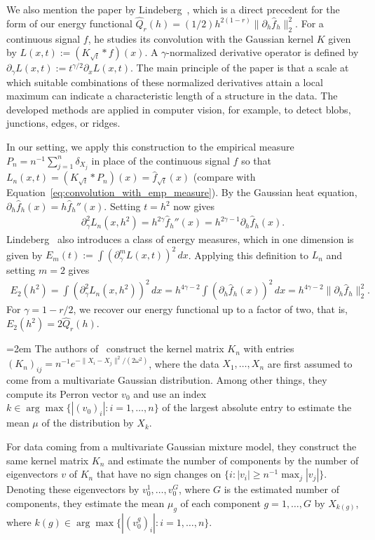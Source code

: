 We also mention the paper by Lindeberg~\cite{lindeberg_feature_nodate}, which is a direct precedent for the form of our energy functional $\hat{Q}_r(h)=(1/2)h^{2(1-r)}\|\partial_h\hat{f}_h\|_2^2$. For a continuous signal $f$, he studies its convolution with the Gaussian kernel $K$ given by $L(x,t):=(K_{\sqrt{t}}\ast f)(x)$. A $\gamma$-normalized derivative operator is defined by $\partial_{\gamma}L(x,t):=t^{\gamma/2}\partial_xL(x,t)$. The main principle of the paper is that a scale at which suitable combinations of these normalized derivatives attain a local maximum can indicate a characteristic length of a structure in the data. The developed methods are applied in computer vision, for example, to detect blobs, junctions, edges, or ridges.

In our setting, we apply this construction to the empirical measure $P_n=n^{-1}\sum_{j=1}^{n}\delta_{X_j}$ in place of the continuous signal $f$ so that $L_n(x,t)=(K_{\sqrt{t}}\ast P_n)(x)=\hat{f}_{\sqrt{t}}(x)$ (compare with Equation~\eqref{eq:convolution_with_emp_measure}). By the Gaussian heat equation, $\partial_h\hat{f}_h(x)=h\hat{f}_h''(x)$. Setting $t=h^2$ now gives
\begin{align*}
    \partial_{\gamma}^2L_n(x,h^2)=h^{2\gamma}\hat{f}_h''(x)=h^{2\gamma-1}\partial_h\hat{f}_h(x).
\end{align*}
Lindeberg~\cite[Equation~(79)]{lindeberg_feature_nodate} also introduces a class of energy measures, which in one dimension is given by $E_m(t):=\int(\partial_\gamma^mL(x,t))^2\,dx$. Applying this definition to $L_n$ and setting $m=2$ gives
\begin{align*}
    E_2(h^2)=\int(\partial_{\gamma}^2L_n(x,h^2))^2\,dx=h^{4\gamma-2}\int(\partial_h\hat{f}_h(x))^2\,dx=h^{4\gamma-2}\|\partial_h\hat{f}_h\|_2^2.
\end{align*}
For $\gamma=1-r/2$, we recover our energy functional up to a factor of two, that is, $E_2(h^2)=2\hat{Q}_r(h)$.


{\emergencystretch=2em\relax
The authors of~\cite{shi_data_2008} construct the kernel matrix $K_n$ with entries $(K_n)_{ij}=n^{-1}e^{-\|X_i-X_j\|^2/(2\omega^2)}$, where the data $X_1,\dots,X_n$ are first assumed to come from a multivariate Gaussian distribution. Among other things, they compute its Perron vector $v_0$ and use an index $k\in\arg\max\{|(v_0)_i|:i=1,\dots,n\}$ of the largest absolute entry to estimate the mean $\mu$ of the distribution by $X_k$.
\par
}

For data coming from a multivariate Gaussian mixture model, they construct the same kernel matrix $K_n$ and estimate the number of components by the number of eigenvectors $v$ of $K_n$ that have no sign changes on $\{i:|v_i|\ge n^{-1}\max_j|v_j|\}$. Denoting these eigenvectors by $v_0^1,\dots, v_0^G$, where $G$ is the estimated number of components, they estimate the mean $\mu_g$ of each component $g=1,\dots,G$ by $X_{k(g)}$, where $k(g)\in\arg\max\{|(v_0^g)_i|:i=1,\dots,n\}$.

